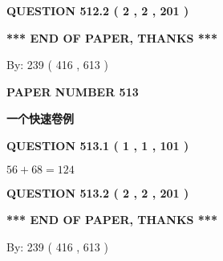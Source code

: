 \documentclass{ctexart}
\begin{document}
 
  
\vspace{0.2in}
  
{\textbf{\Large{QUESTION
512.2 
 ( 2 , 2 , 201 )
}}}
  
  
   
   
 \vspace{0.2in}
 
   
   
   
   
\vspace{1.0in} 
{\textbf{\large{ *** END OF PAPER, THANKS *** }}} 
   
   
\hspace{1.0in} By: 
 239 ( 416 ,  613 )
   
   
   
   
\newpage 
\setcounter{page}{ 
   513001 } 
   
   
   
   
 {\textbf{ \Large{ PAPER NUMBER  513  }}}
   
   
\vspace{0.2in}
   
   
   
   
   
   
 \vspace{0.2in}
{\LARGE {\textbf{ 一个快速卷例}}}
   
   
  
\vspace{0.2in}
  
{\textbf{\Large{QUESTION
513.1 
 ( 1 , 1 , 101 )
}}}
  
  
 
 

$ %
56 +  %
68=   %
124$
 
 
  
\vspace{0.2in}
  
{\textbf{\Large{QUESTION
513.2 
 ( 2 , 2 , 201 )
}}}
  
  
   
   
 \vspace{0.2in}
 
   
   
   
   
\vspace{1.0in} 
{\textbf{\large{ *** END OF PAPER, THANKS *** }}} 
   
   
\hspace{1.0in} By: 
 239 ( 416 ,  613 )
   
\end{document}
